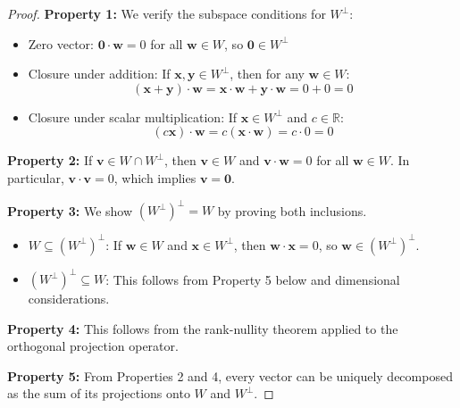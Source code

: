 \documentclass[12pt]{article}
\numberwithin{equation}{section}
\newcommand{\vect}[1]{\boldsymbol{#1}}   %
\theoremstyle{plain}
\theoremstyle{definition}
\theoremstyle{remark}
\begin{document}
\begin{proof}
\textbf{Property 1:} We verify the subspace conditions for $W^{\perp}$:
\begin{itemize}
\item Zero vector: $\vect{0} \cdot \vect{w} = 0$ for all $\vect{w} \in W$, so $\vect{0} \in W^{\perp}$
\item Closure under addition: If $\vect{x}, \vect{y} \in W^{\perp}$, then for any $\vect{w} \in W$:
$$(\vect{x} + \vect{y}) \cdot \vect{w} = \vect{x} \cdot \vect{w} + \vect{y} \cdot \vect{w} = 0 + 0 = 0$$
\item Closure under scalar multiplication: If $\vect{x} \in W^{\perp}$ and $c \in \mathbb{R}$:
$$(c\vect{x}) \cdot \vect{w} = c(\vect{x} \cdot \vect{w}) = c \cdot 0 = 0$$
\end{itemize}

\textbf{Property 2:} If $\vect{v} \in W \cap W^{\perp}$, then $\vect{v} \in W$ and $\vect{v} \cdot \vect{w} = 0$ for all $\vect{w} \in W$. In particular, $\vect{v} \cdot \vect{v} = 0$, which implies $\vect{v} = \vect{0}$.

\textbf{Property 3:} We show $(W^{\perp})^{\perp} = W$ by proving both inclusions.
\begin{itemize}
\item $W \subseteq (W^{\perp})^{\perp}$: If $\vect{w} \in W$ and $\vect{x} \in W^{\perp}$, then $\vect{w} \cdot \vect{x} = 0$, so $\vect{w} \in (W^{\perp})^{\perp}$.
\item $(W^{\perp})^{\perp} \subseteq W$: This follows from Property 5 below and dimensional considerations.
\end{itemize}

\textbf{Property 4:} This follows from the rank-nullity theorem applied to the orthogonal projection operator.

\textbf{Property 5:} From Properties 2 and 4, every vector can be uniquely decomposed as the sum of its projections onto $W$ and $W^{\perp}$.
\end{proof}
\end{document}
